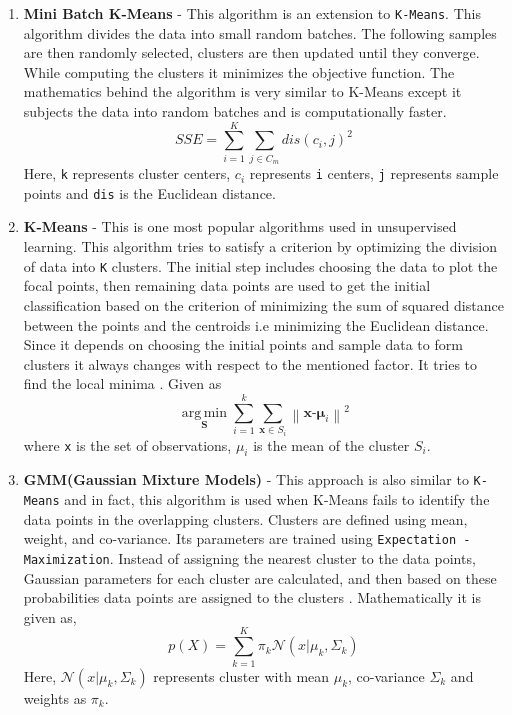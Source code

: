 \begin{enumerate}
       
    \item \textbf{Mini Batch K-Means} - This algorithm is an extension to \texttt{K-Means}. This algorithm divides the data into small random batches. The following samples are then randomly selected, clusters are then updated until they converge. While computing the clusters it minimizes the objective function. The mathematics behind the algorithm is very similar to K-Means except it subjects the data into random batches and is computationally faster.\cite{article}
    \begin{equation*}
        SSE = \sum_{i=1}^K\sum_{j \in C_m} dis(c_i,j)^2
    \end{equation*}
    Here, \texttt{k} represents cluster centers, \texttt{$c_i$} represents \texttt{i} centers, \texttt{j} represents sample points and \texttt{dis} is the Euclidean distance.
    \item \textbf{K-Means} - This is one most popular algorithms used in unsupervised learning. This algorithm tries to satisfy a criterion by optimizing the division of data into \texttt{K} clusters. The initial step includes choosing the data to plot the focal points, then remaining data points are used to get the initial classification based on the criterion of minimizing the sum of squared distance between the points and the centroids i.e minimizing the Euclidean distance. Since it depends on choosing the initial points and sample data to form clusters it always changes with respect to the mentioned factor. It tries to find the local minima \cite{5453745} \cite{article1}. Given as
    \begin{equation*}
       {\displaystyle {\underset {\mathbf {S} }{\operatorname {arg\,min} }}\sum _{i=1}^{k}\sum _{\mathbf {x} \in S_{i}}\left\|\mathbf {x} \textbf{-}{\boldsymbol {\mu }}_{i}\right\|^{2}} 
    \end{equation*}
    where \texttt{x} is the set of observations, \texttt{$\mu_i$} is the mean of the cluster \texttt{$S_i$}.
    
    \item \textbf{GMM(Gaussian Mixture Models)} - This approach is also similar to \texttt{K-Means} and in fact, this algorithm is used when K-Means fails to identify the data points in the overlapping clusters. Clusters are defined using mean, weight, and co-variance. Its parameters are trained using \texttt{Expectation - Maximization}. Instead of assigning the nearest cluster to the data points, Gaussian parameters for each cluster are calculated, and then based on these probabilities data points are assigned to the clusters \cite{Sridharan2014GaussianMM}. Mathematically it is given as,
    \begin{equation*}
      p(X) = \sum _{k=1}^{K} \pi_k\mathcal{N}(x|\mu_k,\Sigma_k)  
    \end{equation*}
    Here, \texttt{$\mathcal{N}(x|\mu_k,\Sigma_k)$} represents cluster with mean $\mu_k$, co-variance $\Sigma_k$ and weights as $\pi_k$. 
 
    
\end{enumerate}


